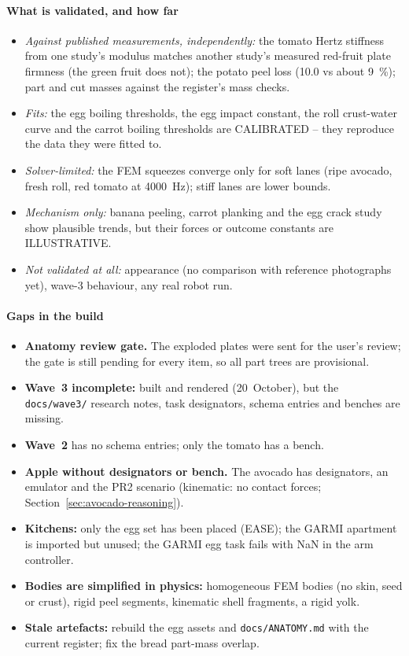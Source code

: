 \documentclass[10.5pt,a4paper]{article}
\begin{document}
\paragraph{What is validated, and how far}
\begin{itemize}
\item \emph{Against published measurements, independently:} the tomato Hertz stiffness from one study's modulus
matches another study's measured red-fruit plate firmness (the green fruit does not); the potato peel loss (10.0 vs
about 9~\%); part and cut masses against the register's mass checks.
\item \emph{Fits:} the egg boiling thresholds, the egg impact constant, the roll crust-water curve and the carrot boiling
thresholds are CALIBRATED -- they reproduce the data they were fitted to.
\item \emph{Solver-limited:} the FEM squeezes converge only for soft lanes (ripe avocado, fresh roll, red tomato at
4000~Hz); stiff lanes are lower bounds.
\item \emph{Mechanism only:} banana peeling, carrot planking and the egg crack study show plausible trends, but their
forces or outcome constants are ILLUSTRATIVE.
\item \emph{Not validated at all:} appearance (no comparison with reference photographs yet), wave-3 behaviour, any
real robot run.
\end{itemize}
\paragraph{Gaps in the build}
\begin{itemize}
\item \textbf{Anatomy review gate.} The exploded plates were sent for the user's review; the gate is still pending for
every item, so all part trees are provisional.
\item \textbf{Wave~3 incomplete:} built and rendered (20~October), but the \texttt{docs/wave3/} research
notes, task designators, schema entries and benches are missing.
\item \textbf{Wave~2} has no schema entries; only the tomato has a bench.
\item \textbf{Apple without designators or bench.} The avocado has designators, an emulator and the PR2 scenario
(kinematic: no contact forces; Section~\ref{sec:avocado-reasoning}).
\item \textbf{Kitchens:} only the egg set has been placed (EASE); the GARMI apartment is imported but unused; the
GARMI egg task fails with NaN in the arm controller.
\item \textbf{Bodies are simplified in physics:} homogeneous FEM bodies (no skin, seed or crust), rigid peel segments,
kinematic shell fragments, a rigid yolk.
\item \textbf{Stale artefacts:} rebuild the egg assets and \texttt{docs/ANATOMY.md} with the current register; fix the
bread part-mass overlap.
\end{itemize}
\end{document}
